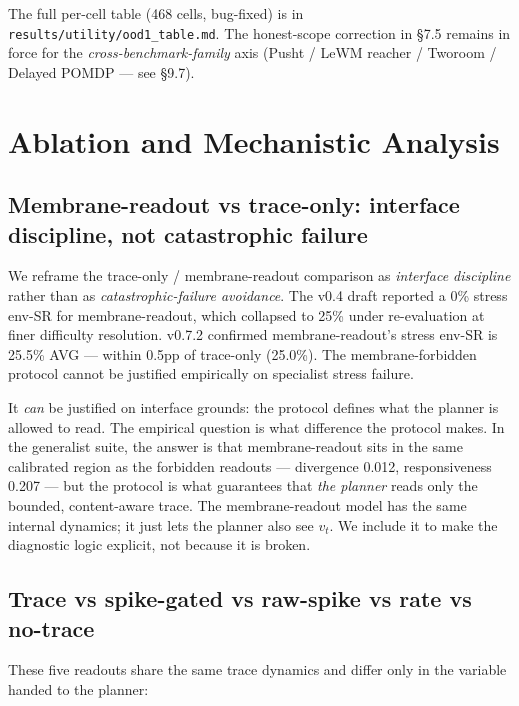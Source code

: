 \documentclass{article}
\begin{document}
The full per-cell table (468 cells, bug-fixed) is in
\texttt{results/utility/ood1\_table.md}. The honest-scope correction in §7.5
remains in force for the \emph{cross-benchmark-family} axis (Pusht /
LeWM reacher / Tworoom / Delayed POMDP --- see §9.7).

\section{Ablation and Mechanistic Analysis}

\subsection{Membrane-readout vs trace-only: interface discipline, not catastrophic failure}

We reframe the trace-only / membrane-readout comparison as
\emph{interface discipline} rather than as \emph{catastrophic-failure
avoidance}. The v0.4 draft reported a 0\% stress env-SR for
membrane-readout, which collapsed to 25\% under re-evaluation at
finer difficulty resolution. v0.7.2 confirmed membrane-readout's
stress env-SR is 25.5\% AVG --- within 0.5pp of trace-only (25.0\%).
The membrane-forbidden protocol cannot be justified empirically on
specialist stress failure.

It \emph{can} be justified on interface grounds: the protocol defines
what the planner is allowed to read. The empirical question is what
difference the protocol makes. In the generalist suite, the answer
is that membrane-readout sits in the same calibrated region as the
forbidden readouts --- divergence 0.012, responsiveness 0.207 --- but
the protocol is what guarantees that \emph{the planner} reads only
the bounded, content-aware trace. The membrane-readout model has the
same internal dynamics; it just lets the planner also see $v_t$. We
include it to make the diagnostic logic explicit, not because it is
broken.

\subsection{Trace vs spike-gated vs raw-spike vs rate vs no-trace}

These five readouts share the same trace dynamics and differ only in
the variable handed to the planner:
\end{document}
